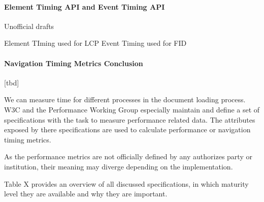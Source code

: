 


\paragraph{Element Timing API and Event Timing API}

Unofficial drafts




Element TIming used for LCP
Event Timing used for FID







\paragraph{Navigation Timing Metrics Conclusion}

[tbd]

We can measure time for different processes in the document loading process.
W3C and the Performance Working Group especially maintain and define a set of specifications with the task to measure performance related data.
The attributes exposed by there specifications are used to calculate performance or navigation timing metrics.

As the performance metrics are not officially defined by any authorizes party or institution, their meaning may diverge depending on the implementation.

Table X provides an overview of all discussed specifications, in which maturity level they are available and why they are important.



